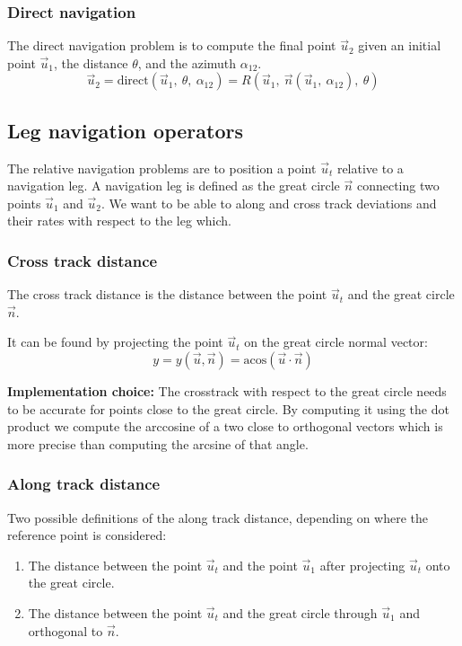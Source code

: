 \subsubsection{Direct navigation}
The direct navigation problem is to compute the final point $\vec{u}_2$ given an initial point $\vec{u}_1$, the distance $\theta$, and the azimuth $\alpha_{12}$. 
\begin{equation}
    \vec{u}_2 = \text{direct} (\vec{u}_1, \ \theta, \ \alpha_{12}) = 
	R(\vec{u}_1, \ \vec{n} (\vec{u}_1, \ \alpha_{12}), \ \theta)
\end{equation}

\subsection{Leg navigation operators}
The relative navigation problems are to position a point $\vec{u}_t$ relative to a navigation leg. A navigation leg is defined as the great circle $\vec{n}$ connecting two points $\vec{u}_1$ and $\vec{u}_2$. We want to be able to along and cross track deviations and their rates with respect to the leg which.

\subsubsection{Cross track distance}
The cross track distance is the distance between the point $\vec{u}_t$ and the great circle $\vec{n}$.

It can be found by projecting the point $\vec{u}_t$ on the great circle normal vector:
\begin{equation}
	y = y(\vec{u}, \vec{n}) = \text{acos} (\vec{u} \cdot \vec{n})
\end{equation}

\textbf{{Implementation choice:}}
The crosstrack with respect to the great circle needs to be accurate for points close to the great circle. By computing it using the dot product we compute the arccosine of a two close to orthogonal vectors which is more precise than computing the arcsine of that angle.

\subsubsection{Along track distance}
Two possible definitions of the along track distance, depending on where the reference point is considered:
\begin{enumerate}
	\item The distance between the point $\vec{u}_t$ and the point $\vec{u}_1$ after projecting $\vec{u}_t$ onto the great circle.
	\item The distance between the point $\vec{u}_t$ and the great circle through $\vec{u}_1$ and orthogonal to $\vec{n}$.
\end{enumerate}


